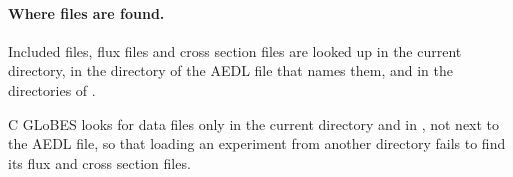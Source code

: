\paragraph{Where files are found.} Included files, flux files and cross
section files are looked up in the current directory, in the directory of the
AEDL file that names them, and in the directories of .

\begin{cdiff}
C GLoBES looks for data files only in the current directory and in
, not next to the AEDL file, so that loading an experiment from
another directory fails to find its flux and cross section files.
\end{cdiff}
